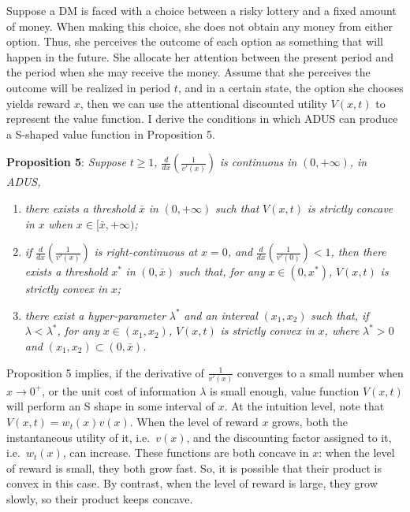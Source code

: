 \documentclass[
  12pt,
]{article}
\begin{document}
Suppose a DM is faced with a choice between a risky lottery and a fixed
amount of money. When making this choice, she does not obtain any money
from either option. Thus, she perceives the outcome of each option as
something that will happen in the future. She allocate her attention
between the present period and the period when she may receive the
money. Assume that she perceives the outcome will be realized in period
\(t\), and in a certain state, the option she chooses yields reward
\(x\), then we can use the attentional discounted utility \(V(x,t)\) to
represent the value function. I derive the conditions in which ADUS can
produce a S-shaped value function in Proposition 5.

\textbf{Proposition 5}: \emph{Suppose} \(t\geq1\)\emph{,}
\(\frac{d}{dx}\left(\frac{1}{v'(x)}\right)\) \emph{is continuous in}
\((0,+\infty)\)\emph{, in ADUS,}

\begin{enumerate}
\def\labelenumi{\arabic{enumi})}
\item
  \emph{there exists a threshold} \(\bar{x}\) \emph{in} \((0,+\infty)\)
  \emph{such that} \(V(x,t)\) \emph{is strictly concave in} \(x\)
  \emph{when} \(x\in [\bar{x},+\infty)\)\emph{;}
\item
  \emph{if} \(\frac{d}{dx}\left(\frac{1}{v'(x)}\right)\) \emph{is
  right-continuous at} \(x=0\)\emph{, and}
  \(\frac{d}{dx}\left(\frac{1}{v'(0)}\right)<1\)\emph{, then there
  exists a threshold} \(x^*\) \emph{in} \((0, \bar{x})\) \emph{such
  that, for any} \(x\in (0,x^*)\)\emph{,} \(V(x,t)\) \emph{is strictly
  convex in} \(x\)\emph{;}
\item
  \emph{there exist a hyper-parameter} \(\lambda^*\) \emph{and an
  interval} \((x_1,x_2)\) \emph{such that, if}
  \(\lambda<\lambda^*\)\emph{, for any} \(x\in(x_1,x_2)\)\emph{,}
  \(V(x,t)\) \emph{is strictly convex in} \(x\)\emph{, where}
  \(\lambda^*>0\) \emph{and} \((x_1,x_2)\subset(0,\bar{x})\)\emph{.}
\end{enumerate}

Proposition 5 implies, if the derivative of \(\frac{1}{v'(x)}\)
converges to a small number when \(x\rightarrow 0^+\), or the unit cost
of information \(\lambda\) is small enough, value function \(V(x,t)\)
will perform an S shape in some interval of \(x\). At the intuition
level, note that \(V(x,t)=w_t(x)v(x)\). When the level of reward \(x\)
grows, both the instantaneous utility of it, i.e.~\(v(x)\), and the
discounting factor assigned to it, i.e.~\(w_t(x)\), can increase. These
functions are both concave in \(x\): when the level of reward is small,
they both grow fast. So, it is possible that their product is convex in
this case. By contrast, when the level of reward is large, they grow
slowly, so their product keeps concave.
\end{document}
